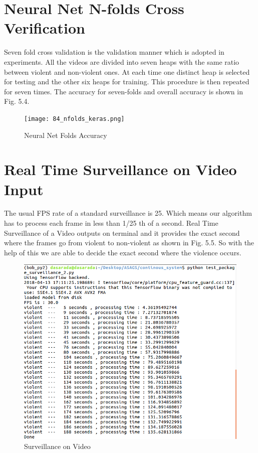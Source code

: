 \section{Neural Net N-folds Cross Verification}
Seven fold cross validation is the validation manner which is adopted in
experiments. All the videos are divided into seven heaps with the same ratio between
violent and non-violent ones. At each time one distinct heap is selected for testing and the other six heaps for training. This procedure is then repeated for seven times. The accuracy for seven-folds and overall accuracy is shown in Fig. 5.4.
\begin{figure}[H]
\centering
\texttt{[image: 84\_nfolds\_keras.png]}
\caption{Neural Net Folds Accuracy}
\end{figure}
\section{Real Time Surveillance on Video Input}
The usual FPS rate of a standard surveillance is 25. Which means our algorithm has to process each frame in less than 1/25 th of a second. Real Time Surveillance of a Video outputs on terminal and it provides the exact second where the frames go from violent to non-violent as shown in Fig. 5.5. So with the help of this we are able to decide the exact second where the violence occurs. 
\begin{figure}[H]
\centering
\includegraphics[width = \linewidth]{process_time.png}
\caption{Surveillance on Video}
\end{figure}
